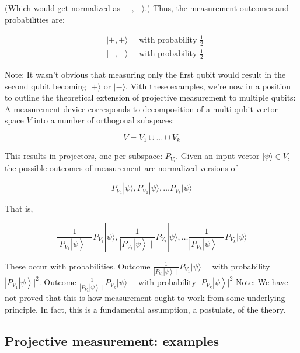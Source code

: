 \documentclass[main.tex]{subfiles}
\begin{document}
    (Which would get normalized as $|-,-\rangle$.) Thus, the measurement outcomes and probabilities are:
    
    $$
    \begin{aligned}
    &|+,+\rangle \quad \text { with probability } \frac{1}{2} \\
    &|-,-\rangle \quad \text { with probability } \frac{1}{2}
    \end{aligned}
    $$
    
    Note: It wasn't obvious that measuring only the first qubit would result in the second qubit becoming $|+\rangle$ or $|-\rangle$. Vith these examples, we're now in a position to outline the theoretical extension of projective measurement to multiple qubits: A measurement device corresponds to decomposition of a multi-qubit vector space $V$ into a number of orthogonal subspaces:
    
    $$
    V=V_{1} \cup \ldots \cup V_{k}
    $$
    
    This results in projectors, one per subspace: $P_{V_{i}}$. Given an input vector $|\psi\rangle \in V$, the possible outcomes of measurement are normalized versions of
    
    $$
    P_{V_{1}}|\psi\rangle, P_{V_{2}}|\psi\rangle, \ldots P_{V_{k}}|\psi\rangle
    $$
    
    That is,
    
    $$
    \frac{1}{\left.\left|P_{V_{1}}\right| \psi\right\rangle \mid} P_{V_{1}}|\psi\rangle, \frac{1}{\left.\left|P_{V_{2}}\right| \psi\right\rangle \mid} P_{V_{2}}|\psi\rangle, \ldots \frac{1}{\left.\left|P_{V_{k}}\right| \psi\right\rangle \mid} P_{V_{k}}|\psi\rangle
    $$
    
    These occur with probabilities. Outcome $\frac{1}{\left.\left|P_{V_{1}}\right| \psi\right\rangle \mid} P_{V_{1}}|\psi\rangle \quad$ with probability $\left.\left|P_{V_{1}}\right| \psi\right\rangle\left.\right|^{2}$. Outcome $\frac{1}{\left.\left|P_{V_{k}}\right| \psi\right\rangle \mid} P_{V_{k}}|\psi\rangle \quad$ with probability $\left.\left|P_{V_{k}}\right| \psi\right\rangle\left.\right|^{2}$ Note: We have not proved that this is how measurement ought to work from some underlying principle. In fact, this is a fundamental assumption, a postulate, of the theory.
    
\subsection{Projective measurement: examples}
\end{document}

